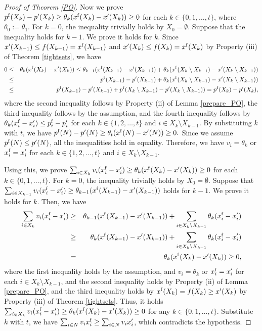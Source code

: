 \documentclass[letterpaper,11pt]{article}
\begin{document}
\begin{proof}[Proof of Theorem \ref{PO}]
Now we prove
$p^{\rm f}(X_k)-p'(X_k)\geq \theta_{k}(x^{\rm f}(X_k)-x'(X_{k}))\geq 0$
for each $k\in \{0,1,\ldots,t\}$, where $\theta_0:=\theta_1$.
For $k=0$, the inequality trivially holds by $X_0=\emptyset$.
Suppose that the inequality holds for $k-1$. We prove it holds for $k$. 
Since $x'(X_{k-1})\leq f(X_{k-1})=x^{\rm f}(X_{k-1})$ and $x'(X_{k})\leq f(X_{k})=x^{\rm f}(X_{k})$ 
by Property (iii) of Theorem \ref{tightsets}, we have  
\begin{eqnarray*}
0&\leq&\theta_{k}(x^{\rm f}(X_{k})-x'(X_{k}))\leq\theta_{k-1}(x^{\rm f}(X_{k-1})-x'(X_{k-1}))+\theta_{k}(x^{\rm f}(X_{k}\setminus X_{k-1})-x'(X_{k}\setminus X_{k-1}))\\
&\leq& p^{\rm f}(X_{k-1})-p'(X_{k-1})+\theta_{k}(x^{\rm f}(X_{k}\setminus X_{k-1})-x'(X_{k}\setminus X_{k-1}))\\
&\leq& p^{\rm f}(X_{k-1})-p'(X_{k-1})+p^{\rm f}(X_{k}\setminus X_{k-1})-p'(X_{k}\setminus X_{k-1}))=p^{\rm f}(X_{k})-p'(X_{k}),
\end{eqnarray*}
where the second inequality follows by Property (ii) of Lemma \ref{prepare_PO}, the third inequality follows by the assumption, and the fourth inequality follows by 
$\theta_{k} (x^{\rm f}_{i}-x'_{i}) \leq p^{\rm f}_{i}- p'_{i}$ for each 
$k\in \{1,2,\ldots,t\}$ and $i\in X_{k}\setminus X_{k-1}$.
By substituting $k$ with $t$, we have $p^{\rm f}(N)-p'(N)\geq \theta_{t}(x^{\rm f}(N)-x'(N))\geq 0.$
Since we assume $p^{\rm f}(N)\leq p'(N)$, all the inequalities hold in equality.
Therefore, 
we have $v_i=\theta_{k}$ or $x^{\rm f}_i= x'_i$ 
for each $k\in \{1,2,\ldots,t\}$ and $i\in X_k\setminus X_{k-1}$.

Using this, we prove $\sum_{i\in X_{k}}v_i (x^{\rm f}_i-x'_i)\geq \theta_{k}(x^{\rm f}(X_{k})-x'(X_{k}))\geq 0$  for each $k\in \{0,1,\ldots,t\}$.
For $k=0$, the inequality trivially holds by $X_0=\emptyset$. 
Suppose that $\sum_{i\in X_{k-1}}v_i (x^{\rm f}_i-x'_i)\geq \theta_{k-1}(x^{\rm f}(X_{k-1})-x'(X_{k-1}))$ holds for $k-1$. We prove it holds for $k$. 
Then, we have
\begin{eqnarray*}
\sum_{i\in X_{k}}v_i (x^{\rm f}_i-x'_i)&\geq& \theta_{k-1} (x^{\rm f}(X_{k-1})-x'(X_{k-1}))+\sum_{i\in X_{k}\setminus X_{k-1}}\theta_{k} (x^{\rm f}_i-x'_i)\\
&\geq& \theta_{k} (x^{\rm f}(X_{k-1})-x'(X_{k-1}))+\sum_{i\in X_{k}\setminus X_{k-1}}\theta_{k} (x^{\rm f}_i-x'_i)\\
&=& \theta_{k} (x^{\rm f}(X_{k})-x'(X_{k}))\geq 0,
\end{eqnarray*}
where the first inequality holds by the assumption, and $v_i=\theta_{k}$ or $x^{\rm f}_i= x'_i$ for each $i\in X_{k}\setminus X_{k-1}$, and 
the second inequality holds by Property (ii) of Lemma \ref{prepare_PO}, 
and the third inequality holds by $x^{\rm f}(X_{k})=f(X_{k})\geq x'(X_{k})$ 
by Property (iii) of Theorem \ref{tightsets}.
Thus, it holds $\sum_{i\in X_{k}}v_i (x^{\rm f}_i-x'_i)\geq \theta_{k} (x^{\rm f}(X_{k})-x'(X_{k}))\geq 0$ for any $k\in \{0,1,\ldots,t\}$.
Substitute $k$ with $t$, we have $\sum_{i\in N}v_i x^{\rm f}_i\geq \sum_{i\in N}v_i x'_i$, which contradicts the hypothesis. 
\end{proof}
\end{document}

